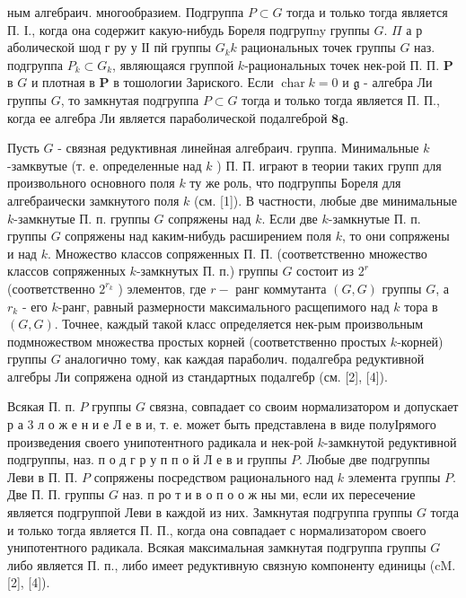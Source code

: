 \documentclass[10pt]{article}
\begin{document}
ным алгебраич. многообразием. Подгруппа $P \subset G$ тогда и только тогда является П. І., когда она содержит какую-нибудь Бореля подгрупny группы $G$. $\Pi$ а р аболической шод г ру у ІІ пй группы $G_{k} k$ рациональных точек группы $G$ наз. подгруппа $P_{k} \subset G_{k}$, являющаяся группой $k$-рациональных точек нек-рой П. П. $\boldsymbol{P}$ в $G$ и плотная в $\boldsymbol{P}$ в тошологии Зариского. Если $\operatorname{char} k=0$ и $\mathfrak{g}$ - алгебра Ли группы $G$, то замкнутая подгруппа $P \subset G$ тогда и только тогда является П. П., когда ее алгебра Ли является параболической подалгеброй $\boldsymbol{8} \mathfrak{g}$.

Пусть $G$ - связная редуктивная линейная алгебраич. группа. Минимальные $k$-замквутые (т. е. определенные над $k$ ) П. П. играют в теории таких групп для произвольного основного поля $k$ ту же роль, что подгруппы Бореля для алгебраически замкнутого поля $k$ (см. [1]). В частности, любые две минимальные $k$-замкнутые П. п. группы $G$ сопряжены над $k$. Если две $k$-замкнутые П. п. группы $G$ сопряжены над каким-нибудь расширением поля $k$, то они сопряжены и над $k$. Множество классов сопряженных П. П. (соответственно множество классов сопряженных $k$-замкнутых П. п.) группы $G$ состоит из $2^{r}$ (соответственно $2^{r_{k}}$ ) элементов, где $r-$ ранг коммутанта $(G, G)$ группы $G$, а $r_{k}$ - его $k$-ранг, равный размерности максимального расщепимого над $k$ тора в $(G, G)$. Точнее, каждый такой класс определяется нек-рым произвольным подмножеством множества простых корней (соответственно простых $k$-корней) группы $G$ аналогично тому, как каждая параболич. подалгебра редуктивной алгебры Ли сопряжена одной из стандартных подалгебр (см. [2], [4]).

Всякая П. п. $P$ группы $G$ связна, совпадает со своим нормализатором и допускает р а 3 л о ж е н и е Л е в и, т. е. может быть представлена в виде полуІрямого произведения своего унипотентного радикала и нек-рой $k$-замкнутой редуктивной подгруппы, наз. п о д г р у п п о й Л е в и группы $P$. Любые две подгруппы Леви в П. П. $P$ сопряжены посредством рационального над $k$ элемента группы $P$. Две П. П. группы $G$ наз. п ро т и в о п о о ж ны ми, если их пересечение является подгруппой Леви в каждой из них. Замкнутая подгруппа группы $G$ тогда и только тогда является П. П., когда она совпадает с нормализатором своего унипотентного радикала. Всякая максимальная замкнутая подгруппа группы $G$ либо является П. п., либо имеет редуктивную связную компоненту единицы (cM. [2], [4]).
\end{document}
